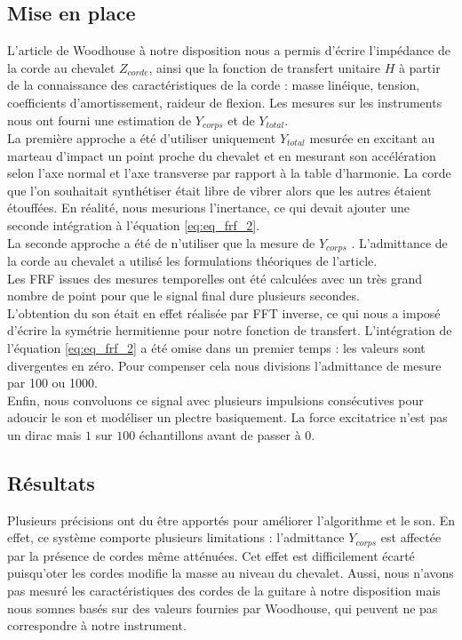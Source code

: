 \subsection{Mise en place}

L'article de Woodhouse à notre disposition nous a permis d'écrire l'impédance
de la corde au chevalet $Z_{corde}$, ainsi que la fonction de transfert
unitaire $H$ à partir de la connaissance des caractéristiques de la corde :
masse linéique, tension, coefficients d'amortissement, raideur de flexion. Les
mesures sur les instruments nous ont fourni une estimation de $Y_{corps}$ et de
$Y_{total}$. \\

La première approche a été d'utiliser uniquement $Y_{total}$ mesurée en
excitant au marteau d'impact un point proche du chevalet et en mesurant son
accélération selon l'axe normal et l'axe transverse par rapport à la table
d'harmonie. La corde que l'on souhaitait synthétiser était libre de vibrer
alors que les autres étaient étouffées. En réalité, nous mesurions l'inertance,
ce qui devait ajouter une seconde intégration à l'équation \ref{eq:eq_frf_2}.\\

La seconde approche a été de n'utiliser que la mesure de $Y_{corps}$ .
L'admittance de la corde au chevalet a utilisé les formulations théoriques de
l'article. \\

Les FRF issues des mesures temporelles ont été calculées avec un très grand
nombre de point pour que le signal final dure plusieurs secondes.\\

L'obtention du son était en effet réalisée par FFT inverse, ce qui nous a
imposé d'écrire la symétrie hermitienne pour notre fonction de transfert.
L'intégration de l'équation \ref{eq:eq_frf_2} a été omise dans un premier temps
: les valeurs sont divergentes en zéro. Pour compenser cela nous divisions
l'admittance de mesure par 100 ou 1000.\\

Enfin, nous convoluons ce signal avec plusieurs impulsions consécutives pour
adoucir le son et modéliser un plectre basiquement. La force excitatrice n'est
pas un dirac mais $1$ sur $100$ échantillons avant de passer à 0.

\subsection{Résultats}
%
Plusieurs précisions ont du être apportés pour améliorer l'algorithme et le
son. En effet, ce système comporte plusieurs limitations : l'admittance
$Y_{corps}$ est affectée par la présence de cordes même atténuées. Cet effet
est difficilement écarté puisqu'oter les cordes modifie la masse au niveau du
chevalet. Aussi, nous n'avons pas mesuré les caractéristiques des cordes de la
guitare à notre disposition mais nous somnes basés sur des valeurs fournies par
Woodhouse, qui peuvent ne pas correspondre à notre instrument.  \\

